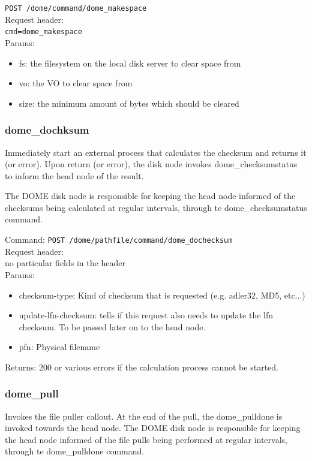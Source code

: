 \documentclass[a4paper,10pt]{scrreprt}
\begin{document}
\lstinline"POST /dome/command/dome_makespace"\\

Request header:\\
\lstinline"cmd=dome_makespace"\\

Params:
\begin{itemize}
 \item fs: the filesystem on the local disk server to clear space from
 \item vo: the VO to clear space from
 \item size: the minimum amount of bytes which should be cleared
\end{itemize}

\subsubsection{dome\_dochksum}
 Immediately start an external process that calculates the checksum and returns it (or error).
 Upon return (or error), the disk node invokes dome\_checksumstatus to inform the head node of the result.

 The DOME disk node is responsible for keeping the head node
 informed of the checksums being calculated at regular intervals,
 through te dome\_checksumstatus command.

Command:
\lstinline"POST /dome/pathfile/command/dome_dochecksum"\\

Request header:\\
no particular fields in the header\\

Params:
\begin{itemize}
 \item checksum-type: Kind of checksum that is requested (e.g. adler32, MD5, etc...)
 \item update-lfn-checksum: tells if this request also needs to update the lfn checksum. To be passed later on to the head node.
 \item pfn: Physical filename
\end{itemize}

Returns: 200 or various errors if the calculation process cannot be started.


\subsubsection{dome\_pull}
 Invokes the file puller callout. At the end of the pull, the dome\_pulldone is invoked towards the head node.
 The DOME disk node is responsible for keeping the head node
 informed of the file pulls being performed at regular intervals,
 through te dome\_pulldone command.\\
\end{document}

